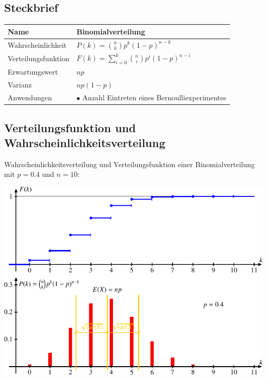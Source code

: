%
%
%
\subsection{Steckbrief}
\begin{center}
\renewcommand{\arraystretch}{1.5}
\begin{tabular}{|l|l|}
\hline
Name&Binomialverteilung\\
\hline
Wahrscheinlichkeit&
\begin{minipage}{3.7in}
\vskip3pt
$\displaystyle P(k)=\binom{n}{k}p^k(1-p)^{n-k}$
\end{minipage}
\\[10pt]
Verteilungsfunktion&
$\displaystyle F(k)=\sum_{i=0}^k\binom{n}{i}p^i(1-p)^{n-i}$
\\[10pt]
Erwartungswert&$\displaystyle np$\\
Varianz&$\displaystyle np(1-p)$\\
\hline
Anwendungen&\begin{minipage}{3.7in}%
\strut
$\bullet$ Anzahl Eintreten eines Bernoulliexperimentes
\strut
\end{minipage}\\
\hline
\end{tabular}
\end{center}

\subsection{Verteilungsfunktion und Wahrscheinlichkeitsverteilung}
Wahrscheinlichkeitsverteilung und Verteilungsfunktion einer
Binomialverteilung mit $p=0.4$ und $n=10$:
\begin{center}
\includegraphics{images/gl-3.pdf}
\end{center}

